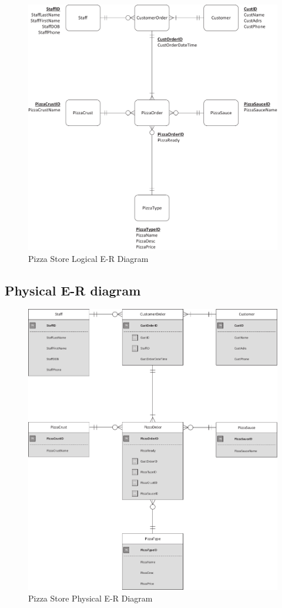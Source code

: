 \begin{figure}[H]
\centering
\caption{Pizza Store Logical E-R Diagram}
\includegraphics[scale=0.5]{./img/CSG1207_A1_PONCE_TASK_3_LER_PIZZA.pdf}
\end{figure}

\subsection{Physical E-R diagram}

\begin{figure}[H]
\centering
\caption{Pizza Store Physical E-R Diagram}
\includegraphics[scale=0.5]{./img/CSG1207_A1_PONCE_TASK_3_PER_PIZZA.pdf}
\end{figure}